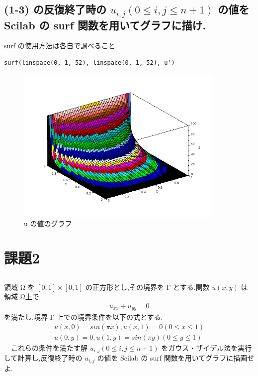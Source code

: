 \documentclass[a4j, 11pt]{jarticle}
\begin{document}
\subsection{(1-3) の反復終了時の \(u_{i,j} (0 \leq i, j \leq n + 1)\) の値を Scilab の surf 関数を用いてグラフに描け.}
\label{sec:org90447c0}
surf の使用方法は各自で調べること.\\
\begin{verbatim}
surf(linspace(0, 1, 52), linspace(0, 1, 52), u')
\end{verbatim}
\begin{figure}[htbp]
\centering
\includegraphics[width=10cm]{./1-4.png}
\caption{u の値のグラフ}
\end{figure}
\section{課題2}
\label{sec:org4ad8538}
\subsection{}
\label{sec:org7461945}
領域 Ω を \([0, 1] \times [0, 1]\) の正方形とし,その境界を Γ とする.関数 \(u(x, y)\) は領域 Ω上で\\
\begin{eqnarray*}
u_{xx} + u_{yy} = 0
\end{eqnarray*}
を満たし,境界 Γ 上での境界条件を以下の式とする.\\
\begin{eqnarray*}
u(x, 0) = sin(\pi x), u(x, 1) = 0 (0 \leq x \leq 1) \\
u(0, y) = 0, u(1, y) = sin(\pi y) (0 \leq y \leq 1)
\end{eqnarray*}
　これらの条件を満たす解 \(u_{i,j} (0 \leq i, j \leq n + 1)\) をガウス・ザイデル法を実行して計算し,反復終了時の \(u_{i,j}\) の値を Scilab の surf 関数を用いてグラフに描画せよ.\\
\end{document}
